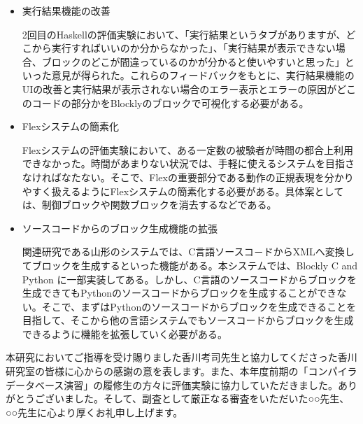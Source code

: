 \documentclass{risepaper}
\begin{document}
\begin{itemize}

\item 実行結果機能の改善

2回目のHaskellの評価実験において、「実行結果というタブがありますが、どこから実行すればいいのか分からなかった」、「実行結果が表示できない場合、ブロックのどこが間違っているのかが分かると使いやすいと思った」といった意見が得られた。これらのフィードバックをもとに、実行結果機能のUIの改善と実行結果が表示されない場合のエラー表示とエラーの原因がどこのコードの部分かをBlocklyのブロックで可視化する必要がある。

\item Flexシステムの簡素化

Flexシステムの評価実験において、ある一定数の被験者が時間の都合上利用できなかった。時間があまりない状況では、手軽に使えるシステムを目指さなければなたない。そこで、Flexの重要部分である動作の正規表現を分かりやすく扱えるようにFlexシステムの簡素化する必要がある。具体案としては、制御ブロックや関数ブロックを消去するなどである。

\item ソースコードからのブロック生成機能の拡張

関連研究である山形のシステムでは、C言語ソースコ－ドからXMLへ変換してブロックを生成するといった機能がある。本システムでは、Blockly C and Python に一部実装してある。しかし、C言語のソースコードからブロックを生成できてもPythonのソースコードからブロックを生成することができない。そこで、まずはPythonのソースコードからブロックを生成できることを目指して、そこから他の言語システムでもソースコードからブロックを生成できるように機能を拡張していく必要がある。

\end{itemize} 
 

\acknowledgment  %

本研究においてご指導を受け賜りました香川考司先生と協力してくださった香川研究室の皆様に心からの感謝の意を表します。また、本年度前期の「コンパイラデータベース演習」の履修生の方々に評価実験に協力していただきました。ありがとうございました。そして、副査として厳正なる審査をいただいた○○先生、○○先生に心より厚くお礼申し上げます。
\end{document}
